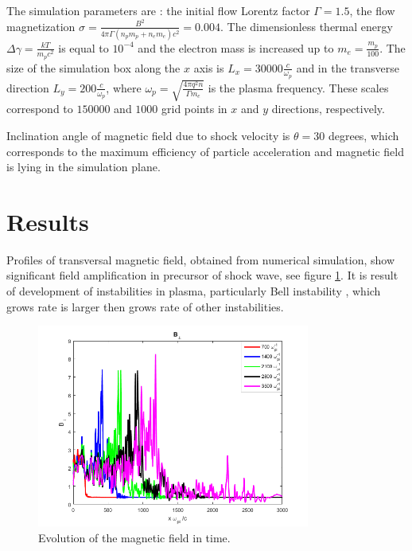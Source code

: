 \documentclass[a4paper]{jpconf}
\begin{document}
	The simulation parameters are : the initial flow Lorentz factor $\Gamma = 1.5$, the flow magnetization $\sigma = \frac{B^2}{4\pi\Gamma (n_p m_p + n_e m_e) c^2} = 0.004$. The dimensionless thermal energy $\Delta \gamma = \frac{k T}{m_p c^2}$ is equal to $10^{-4}$ and the electron mass is increased up to $m_e = \frac{m_p}{100}$. The size of the simulation box along the $x$ axis is $L_x = 30000\frac{c}{\omega_p}$ and in the transverse direction $L_y = 200\frac{c}{\omega_p}$, where $\omega_p = \sqrt{\frac{4\pi q^2 n}{\Gamma m_e}}$ is the plasma frequency. These scales correspond to $150000$ and $1000$ grid points in $x$ and $y$ directions, respectively. 
	
	Inclination angle of magnetic field due to shock velocity is $\theta = 30$ degrees, which corresponds to the maximum efficiency of particle acceleration \cite{Romansky18} and magnetic field is lying in the simulation plane.
	
	
	\section{Results}
	
	Profiles of transversal magnetic field, obtained from numerical simulation, show significant field amplification in precursor of shock wave, see figure \ref{field}. It is result of development of instabilities in plasma, particularly Bell instability \cite{Bell04}, which grows rate is larger then grows rate of other instabilities.
	
	\begin{figure}[h!]
		\centering
		\includegraphics[width=0.8\textwidth]{fig/Bnorm.png} 
		\caption{Evolution of the magnetic field in time.}
		\label{field}
	\end{figure}
	
\end{document}

